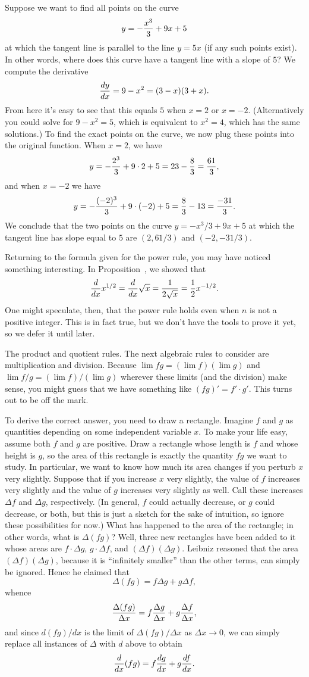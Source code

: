 Suppose we want to find all points on the curve
$$y= -{x^3\over 3} + 9x + 5$$
at which the tangent line is parallel to the line $y=5x$ (if any such points exist). In other words,
where does this curve have a tangent line with a slope of $5$? We compute
the derivative
$${dy\over dx} = 9-x^2  = (3-x)(3+x).$$
From here it's easy to see that this equals $5$ when $x = 2$ or $x=-2$. (Alternatively you could solve for
$9-x^2 = 5$, which is equivalent to $x^2 = 4$, which has the same solutions.)
To find the exact points on the curve, we now plug these points into the original function. When $x=2$,
we have
$$ y = -{2^3\over 3} + 9\cdot 2 + 5 = 23-{8\over 3} = {61\over 3},$$
and when $x=-2$ we have
$$ y = -{(-2)^3\over 3} + 9\cdot(-2) + 5 = {8\over 3} - 13 = {-31\over 3}.$$
We conclude that the two points on the curve $y=-x^3/3 + 9x + 5$ at which the tangent line has slope
equal to $5$ are $(2,61/3)$ and $(-2, -31/3)$.

Returning to the formula given for the power rule, you may have noticed something interesting.
In Proposition~{\propsqrtderiv}, we showed that
$${d\over dx} x^{1/2} = {d\over dx} \sqrt x = {1\over 2\sqrt x} = {1\over 2} x^{-1/2}.$$
One might speculate, then, that the power rule holds even when $n$ is not a positive integer. This is
in fact true, but we don't have the tools to prove it yet, so we defer it until later.

\medskip\boldlabel The product and quotient rules. The next algebraic rules to consider are
multiplication and division. Because $\lim fg = (\lim f)(\lim g)$ and $\lim f/g = (\lim f)/(\lim g)$
wherever these limits (and the division) make sense, you might guess that we have something like
$(fg)' = f'\cdot g'$. This turns out to be off the mark.

To derive the correct answer, you need to draw a rectangle.
Imagine $f$ and $g$ as quantities depending on some independent variable $x$. To make your life easy,
assume both $f$ and $g$ are positive. Draw a rectangle whose length is $f$ and whose height is $g$,
so the area of this rectangle is exactly the quantity $fg$ we want to study. In particular, we want
to know how much its area changes if you perturb $x$ very slightly.
Suppose that if you increase $x$ very slightly, the value of $f$ increases very slightly and the
value of $g$ increases very slightly as well. Call these increases $\Delta f$ and $\Delta g$, respectively.
(In general, $f$ could actually decrease, or $g$ could
decrease, or both, but this is just a sketch for the sake of intuition, so ignore these possibilities
for now.) What has happened to the area of the rectangle; in other words, what is $\Delta(fg)$?
Well, three new rectangles have been added to it
whose areas are $f\cdot \Delta g$, $g\cdot \Delta f$, and $(\Delta f)(\Delta g)$. Leibniz reasoned
that the area $(\Delta f)(\Delta g)$, because it is ``infinitely smaller'' than
the other terms, can simply be ignored. Hence he claimed that
$$\Delta (fg) = f\Delta g + g \Delta f,$$
whence
$${\Delta (fg)\over \Delta x} = f{\Delta g\over \Delta x} + g {\Delta f\over \Delta x},$$
and since $d(fg)/dx$ is the limit of $\Delta(fg)/\Delta x$ as $\Delta x \to 0$, we can simply replace all
instances of $\Delta$ with $d$ above to obtain
$${d\over dx} (fg) = f{dg\over dx} + g{df\over dx}.$$

